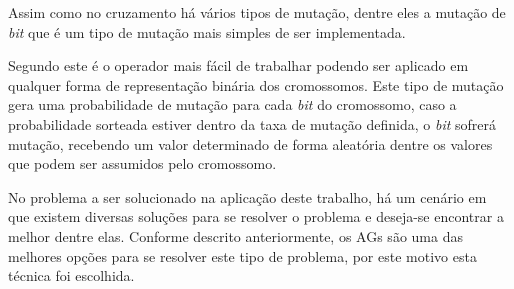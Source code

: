 \par Assim como no cruzamento há vários tipos de mutação, dentre eles a mutação
de \textit{bit} que é um tipo de mutação mais simples de ser implementada.

\par Segundo  este é o operador
mais fácil de trabalhar podendo ser aplicado em qualquer forma de representação
binária dos cromossomos. Este tipo de mutação gera uma probabilidade de mutação
para cada \textit{bit} do cromossomo, caso a probabilidade sorteada estiver
dentro da taxa de mutação definida, o \textit{bit} sofrerá mutação, recebendo um
valor determinado de forma aleatória dentre os valores que podem ser assumidos pelo cromossomo.


\par No problema a ser solucionado na aplicação deste trabalho, há um
cenário em que existem diversas soluções para se resolver o problema e deseja-se
encontrar a melhor dentre elas. Conforme descrito anteriormente, os AGs são uma
das melhores opções para se resolver este tipo de problema, por este motivo esta técnica foi escolhida.

% 


% 


